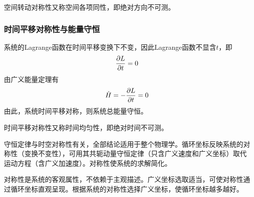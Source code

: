 空间转动对称性又称{\heiti 空间各项同性}，即绝对方向不可测。

\subsubsection{时间平移对称性与能量守恒}

系统的Lagrange函数在时间平移变换下不变，因此Lagrange函数不显含$t$，即
\begin{equation*}
	\frac{\partial L}{\partial t} = 0
\end{equation*}
由广义能量定理有
\begin{equation*}
	\dot{H} = -\frac{\partial L}{\partial t} = 0
\end{equation*}
由此，系统时间平移对称，则系统总能量守恒。

时间平移对称性又称{\heiti 时间均匀性}，即绝对时间不可测。

守恒定律与时空对称性有关，全部结论适用于整个物理学。循环坐标反映系统的对称性（变换不变性），可用其共轭动量守恒定律（只含广义速度和广义坐标）取代运动方程（含广义加速度）。对称性使系统的求解简化。

对称性是系统的客观属性，不依赖于主观描述。广义坐标选取适当，可使对称性通过循环坐标直观呈现。根据系统的对称性选择广义坐标，使循环坐标越多越好。

